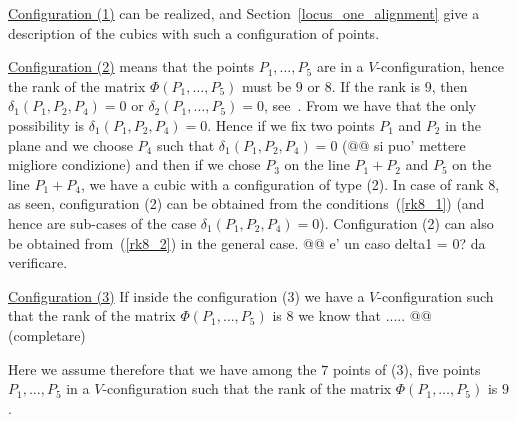 \documentclass{amsart}
\theoremstyle{plain}
\theoremstyle{definition}
\begin{document}
\underline{Configuration (1)} can be realized,
 and Section~\ref{locus_one_alignment}
give a description of the cubics with such a configuration of points.

\underline{Configuration (2)} means that the points $P_1, \dots, P_5$ are in a
$V$-configuration, hence the rank of the matrix $\Phi(P_1, \dots, P_5)$
must be $9$ or $8$. If the rank is $9$, then $\delta_1(P_1, P_2, P_4) = 0$
or $\delta_2(P_1, \dots, P_5) = 0$, see~.
From  we have that the only possibility
is $\delta_1(P_1, P_2, P_4) = 0$. Hence if we fix two points $P_1$ and $P_2$
in the plane and we choose $P_4$ such that $\delta_1(P_1, P_2, P_4) = 0$
(@@ si puo' mettere migliore condizione) and then if we chose $P_3$
on the line $P_1+P_2$ and $P_5$ on the line $P_1+P_4$, we have a cubic
with a configuration of type (2). In case of rank $8$, as seen,
configuration (2) can be
obtained from the conditions~(\ref{rk8_1}) (and hence are sub-cases
of the case $\delta_1(P_1, P_2, P_4)=0$). Configuration (2) can also be
obtained from~(\ref{rk8_2}) in the general case. @@ e' un caso delta1 = 0?
da verificare.

\underline{Configuration (3)} If inside the configuration (3) we
have a $V$-configuration
such that the rank of the matrix $\Phi(P_1, \dots, P_5)$ is $8$
we know that ..... @@ (completare)

Here we assume therefore that we have among the $7$ points of (3),
five points $P_1, \dots, P_5$ in a $V$-configuration such that the
rank of the matrix $\Phi(P_1, \dots, P_5)$ is $9$.
\end{document}
